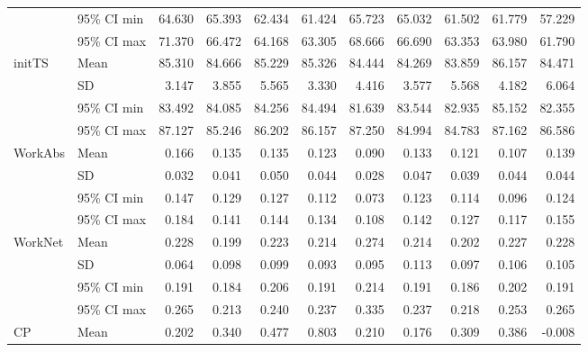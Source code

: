 \begin{longtable}{llrrrrrrrrr}
   & 95\% CI min &     64.630 &     65.393 &     62.434 &     61.424 &     65.723 &     65.032 &     61.502 &     61.779 &     57.229 \\
   & 95\% CI max &     71.370 &     66.472 &     64.168 &     63.305 &     68.666 &     66.690 &     63.353 &     63.980 &     61.790 \\
\cline{1-11}
\multirow{4}{*}{initTS} & Mean &     85.310 &     84.666 &     85.229 &     85.326 &     84.444 &     84.269 &     83.859 &     86.157 &     84.471 \\
   & SD &      3.147 &      3.855 &      5.565 &      3.330 &      4.416 &      3.577 &      5.568 &      4.182 &      6.064 \\
   & 95\% CI min &     83.492 &     84.085 &     84.256 &     84.494 &     81.639 &     83.544 &     82.935 &     85.152 &     82.355 \\
   & 95\% CI max &     87.127 &     85.246 &     86.202 &     86.157 &     87.250 &     84.994 &     84.783 &     87.162 &     86.586 \\
\cline{1-11}
\multirow{4}{*}{WorkAbs} & Mean &      0.166 &      0.135 &      0.135 &      0.123 &      0.090 &      0.133 &      0.121 &      0.107 &      0.139 \\
   & SD &      0.032 &      0.041 &      0.050 &      0.044 &      0.028 &      0.047 &      0.039 &      0.044 &      0.044 \\
   & 95\% CI min &      0.147 &      0.129 &      0.127 &      0.112 &      0.073 &      0.123 &      0.114 &      0.096 &      0.124 \\
   & 95\% CI max &      0.184 &      0.141 &      0.144 &      0.134 &      0.108 &      0.142 &      0.127 &      0.117 &      0.155 \\
\cline{1-11}
\multirow{4}{*}{WorkNet} & Mean &      0.228 &      0.199 &      0.223 &      0.214 &      0.274 &      0.214 &      0.202 &      0.227 &      0.228 \\
   & SD &      0.064 &      0.098 &      0.099 &      0.093 &      0.095 &      0.113 &      0.097 &      0.106 &      0.105 \\
   & 95\% CI min &      0.191 &      0.184 &      0.206 &      0.191 &      0.214 &      0.191 &      0.186 &      0.202 &      0.191 \\
   & 95\% CI max &      0.265 &      0.213 &      0.240 &      0.237 &      0.335 &      0.237 &      0.218 &      0.253 &      0.265 \\
\cline{1-11}
\multirow{4}{*}{CP} & Mean &      0.202 &      0.340 &      0.477 &      0.803 &      0.210 &      0.176 &      0.309 &      0.386 &     -0.008 \\

\end{longtable}
